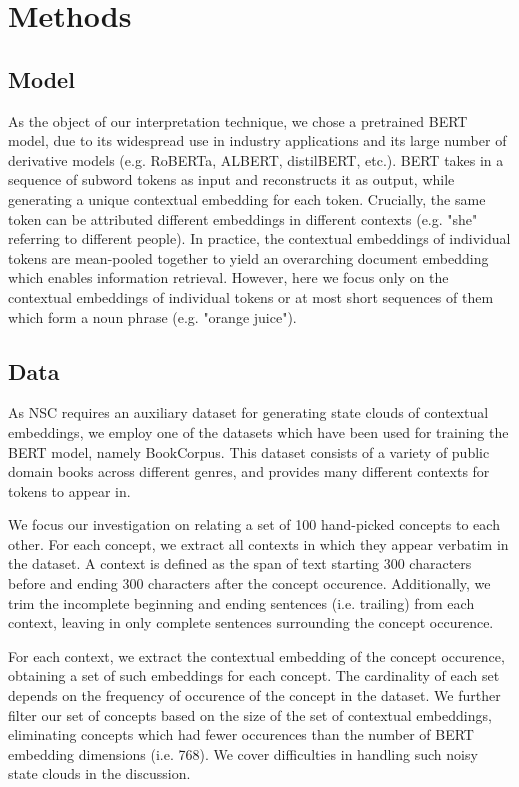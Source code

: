 \section{Methods}\label{sec:methods}

\subsection{Model}

As the object of our interpretation technique, we chose a pretrained BERT model, due to its widespread use in industry applications and its large number of derivative models (e.g. RoBERTa, ALBERT, distilBERT, etc.). BERT takes in a sequence of subword tokens as input and reconstructs it as output, while generating a unique contextual embedding for each token. Crucially, the same token can be attributed different embeddings in different contexts (e.g. "she" referring to different people). In practice, the contextual embeddings of individual tokens are mean-pooled together to yield an overarching document embedding which enables information retrieval. However, here we focus only on the contextual embeddings of individual tokens or at most short sequences of them which form a noun phrase (e.g. "orange juice").

\subsection{Data}

As NSC requires an auxiliary dataset for generating state clouds of contextual embeddings, we employ one of the datasets which have been used for training the BERT model, namely BookCorpus. This dataset consists of a variety of public domain books across different genres, and provides many different contexts for tokens to appear in.

We focus our investigation on relating a set of 100 hand-picked concepts to each other. For each concept, we extract all contexts in which they appear verbatim in the dataset. A context is defined as the span of text starting 300 characters before and ending 300 characters after the concept occurence. Additionally, we trim the incomplete beginning and ending sentences (i.e. trailing) from each context, leaving in only complete sentences surrounding the concept occurence.

For each context, we extract the contextual embedding of the concept occurence, obtaining a set of such embeddings for each concept. The cardinality of each set depends on the frequency of occurence of the concept in the dataset. We further filter our set of concepts based on the size of the set of contextual embeddings, eliminating concepts which had fewer occurences than the number of BERT embedding dimensions (i.e. 768). We cover difficulties in handling such noisy state clouds in the discussion.

